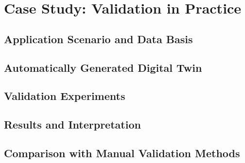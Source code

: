 \chapter{Case Study: Validation in Practice}
\label{chap:case-study}

\section{Application Scenario and Data Basis}

\section{Automatically Generated Digital Twin}

\section{Validation Experiments}

\section{Results and Interpretation}

\section{Comparison with Manual Validation Methods}
